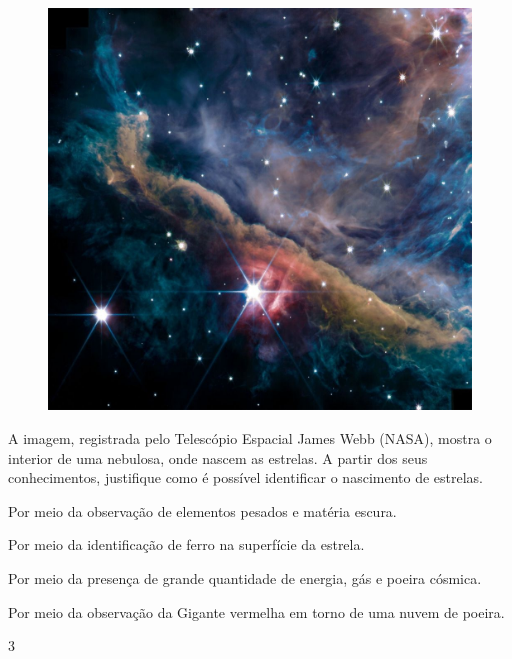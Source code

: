 \begin{figure}[htpb!]
\centering
\includegraphics[width=.8\textwidth]{./imgs/img13.jpg}
\end{figure}

A imagem, registrada pelo Telescópio Espacial James Webb (NASA), mostra o
interior de uma nebulosa, onde nascem as estrelas. A partir dos seus
conhecimentos, justifique como é possível identificar o nascimento de
estrelas.

\begin{escolha}
\item
  Por meio da observação de elementos pesados e matéria escura.
\item
  Por meio da identificação de ferro na superfície da estrela.
\item
  Por meio da presença de grande quantidade de energia, gás e poeira cósmica.
\item
 Por meio da observação da Gigante vermelha em torno de uma nuvem de poeira.
\end{escolha}

\pagebreak
\num{3}


